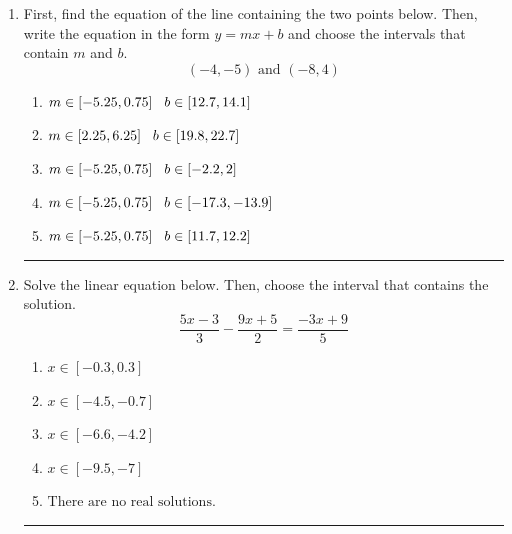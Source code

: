 \documentclass[14pt]{extbook}
\newcommand{\litem}[1]{\item#1\hspace*{-1cm}\rule{\textwidth}{0.4pt}}
\begin{document}
\begin{enumerate}
\litem{
First, find the equation of the line containing the two points below. Then, write the equation in the form $ y=mx+b $ and choose the intervals that contain $m$ and $b$.\[ (-4, -5) \text{ and } (-8, 4) \]\begin{enumerate}[label=\Alph*.]
\item \( m \in [-5.25, 0.75] \hspace*{3mm} b \in [12.7, 14.1] \)
\item \( m \in [2.25, 6.25] \hspace*{3mm} b \in [19.8, 22.7] \)
\item \( m \in [-5.25, 0.75] \hspace*{3mm} b \in [-2.2, 2] \)
\item \( m \in [-5.25, 0.75] \hspace*{3mm} b \in [-17.3, -13.9] \)
\item \( m \in [-5.25, 0.75] \hspace*{3mm} b \in [11.7, 12.2] \)

\end{enumerate} }
\litem{
Solve the linear equation below. Then, choose the interval that contains the solution.\[ \frac{5x -3}{3} - \frac{9x + 5}{2} = \frac{-3x + 9}{5} \]\begin{enumerate}[label=\Alph*.]
\item \( x \in [-0.3, 0.3] \)
\item \( x \in [-4.5, -0.7] \)
\item \( x \in [-6.6, -4.2] \)
\item \( x \in [-9.5, -7] \)
\item \( \text{There are no real solutions.} \)


\end{enumerate}}
\end{enumerate}
\end{document}

